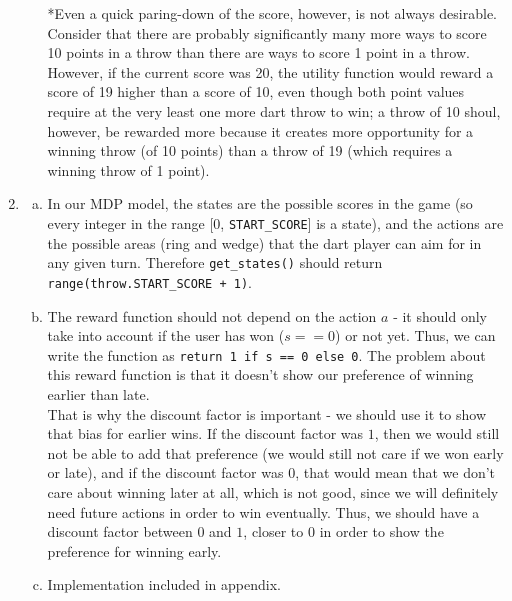 \documentclass{article}
\begin{document}
\begin{enumerate}
\begin{enumerate}[(a)]
                *Even a quick paring-down of the score, however, is not always desirable. Consider that there are probably significantly many more ways to score 10 points in a throw than there are ways to score 1 point in a throw. However, if the current score was 20, the utility function would reward a score of 19 higher than a score of 10, even though both point values require at the very least one more dart throw to win; a throw of 10 shoul, however, be rewarded more because it creates more opportunity for a winning throw (of 10 points) than a throw of 19 (which requires a winning throw of 1 point).
            \end{enumerate}
        \item
            \begin{enumerate}[(a)]
                \item In our MDP model, the states are the possible scores in the game (so every integer in the range [0, \texttt{START\_SCORE}] is a state), and the actions are the possible areas (ring and wedge) that the dart player can aim for in any given turn. Therefore \texttt{get\_states()} should return \texttt{range(throw.START\_SCORE + 1)}.
                \item The reward function should not depend on the action $a$ - it should only take into account if the user has won ($s==0$) or not yet.  Thus, we can write the function as \texttt{return 1 if s == 0 else 0}. The problem about this reward function is that it doesn't show our preference of winning earlier than late.\\
                
               That is why the discount factor is important - we should use it to show that bias for earlier wins. If the discount factor was $1$, then we would still not be able to add that preference (we would still not care if we won early or late), and if the discount factor was $0$, that would mean that we don't care about winning later at all, which is not good, since we will definitely need future actions in order to win eventually. Thus, we should have a discount factor between $0$ and $1$, closer to $0$ in order to show the preference for winning early.
                 \item Implementation included in appendix.
                

\end{enumerate}
\end{enumerate}
\end{document}

